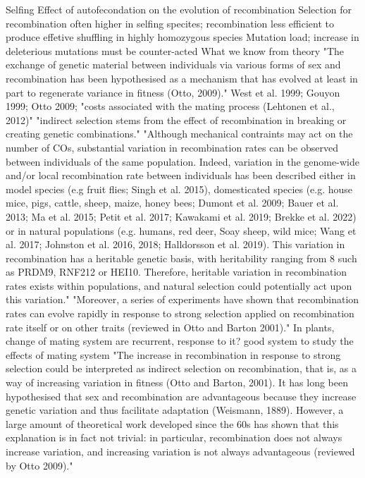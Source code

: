 \documentclass{article}
\begin{document}
Selfing
Effect of autofecondation on the evolution of recombination
Selection for recombination often higher in selfing specites; recombination less efficient to produce effetive shuffling
in highly homozygous species
Mutation load; increase in deleterious mutations must be counter-acted
What we know from theory
"The exchange of genetic material between individuals via various forms of sex and recombination has been hypothesised as a mechanism that has evolved at least in part to regenerate variance in fitness (Otto, 2009)."
West et al. 1999; Gouyon 1999; Otto 2009;
"costs associated with the mating process (Lehtonen et al., 2012)"
"indirect selection stems from the effect of recombination in breaking or creating genetic combinations."
"Although mechanical contraints may act on the number of COs, substantial variation in recombination rates can be observed between individuals of the same population. Indeed, variation in the genome-wide and/or local recombination rate between individuals has been described either in model species (e.g fruit flies; Singh et al. 2015), domesticated species (e.g. house mice, pigs, cattle, sheep, maize, honey bees; Dumont et al. 2009; Bauer et al. 2013; Ma et al. 2015; Petit et al. 2017; Kawakami et al. 2019; Brekke et al. 2022) or in natural populations (e.g. humans, red deer, Soay sheep, wild mice; Wang et al. 2017; Johnston et al. 2016, 2018; Halldorsson et al. 2019). This variation in recombination has a heritable genetic basis, with heritability ranging from 8%
such as PRDM9, RNF212 or HEI10. Therefore, heritable variation in recombination rates exists within populations, and natural selection could potentially act upon this variation."
"Moreover, a series of experiments have shown that recombination rates can evolve rapidly in response to strong selection applied on recombination rate itself or on other traits (reviewed in Otto and Barton 2001)."
In plants, change of mating system are recurrent, response to it? good system to study the effects of mating system
"The increase in recombination in response to strong selection could be interpreted as indirect selection on recombination, that is, as a way of increasing variation in fitness (Otto and Barton, 2001). It has long been hypothesised that sex and recombination are advantageous because they increase genetic variation and thus facilitate adaptation (Weismann, 1889). However, a large amount of theoretical work developed since the 60s has shown that this explanation is in fact not trivial: in particular, recombination does not always increase variation, and increasing variation is not always advantageous (reviewed by Otto 2009)."
\end{document}
